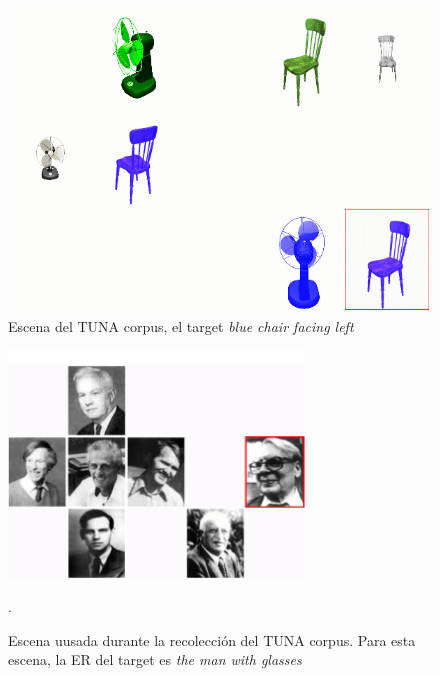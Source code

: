 \begin{figure}[ht]
\centering
\includegraphics[width=\textwidth]{images/tuna.jpg}
\caption{Escena del TUNA corpus, el target \emph{blue chair facing left}}
\label{Tuna-scene}
\end{figure}

\begin{figure}[ht]
\centering
\includegraphics[width=0.7\textwidth]{images/tuna-people.jpg}
\caption{Escena uusada durante la recolecci\'on del TUNA corpus. Para esta escena, la ER del target es \emph{the man with glasses}}. 
\label{Tuna-people-scene}
\centering

\end{figure} 


